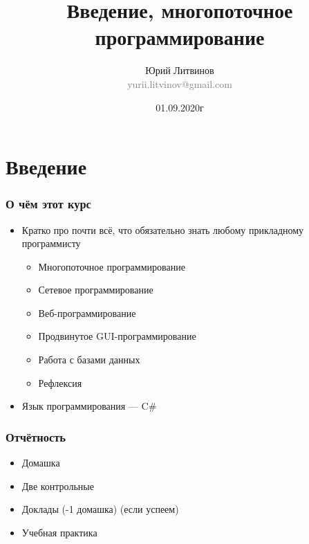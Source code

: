 \documentclass[xetex,mathserif,serif]{beamer}
\title{Введение, многопоточное программирование}
\author[Юрий Литвинов]{Юрий Литвинов\\\small{\textcolor{gray}{yurii.litvinov@gmail.com}}}
\date{01.09.2020г}
\begin{document}
    \frame{\titlepage}

    \section{Введение}

    \begin{frame}
        \frametitle{О чём этот курс}
        \begin{itemize}
            \item Кратко про почти всё, что обязательно знать любому прикладному программисту
            \begin{itemize}
                \item Многопоточное программирование
                \item Сетевое программирование
                \item Веб-программирование
                \item Продвинутое GUI-программирование
                \item Работа с базами данных
                \item Рефлексия
            \end{itemize}
            \item Язык программирования --- C\#
        \end{itemize}
    \end{frame}

    \begin{frame}
        \frametitle{Отчётность}
        \begin{itemize}
            \item Домашка
            \item Две контрольные
            \item Доклады (-1 домашка) (если успеем)
            \item Учебная практика
        \end{itemize}
    \end{frame}
\end{document}
